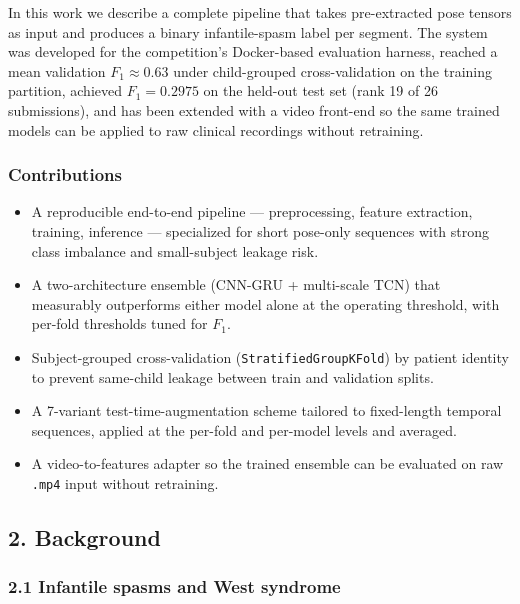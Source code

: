 \documentclass[
  11pt,
]{article}
\providecommand{\tightlist}{%
  \setlength{\itemsep}{0pt}\setlength{\parskip}{0pt}}
\begin{document}
In this work we describe a complete pipeline that takes pre-extracted
pose tensors as input and produces a binary infantile-spasm label per
segment. The system was developed for the competition's Docker-based
evaluation harness, reached a mean validation \(F_1 \approx 0.63\) under
child-grouped cross-validation on the training partition, achieved
\(F_1 = 0.2975\) on the held-out test set (rank 19 of 26 submissions),
and has been extended with a video front-end so the same trained models
can be applied to raw clinical recordings without retraining.

\subsubsection{Contributions}\label{contributions}

\begin{itemize}
\tightlist
\item
  A reproducible end-to-end pipeline --- preprocessing, feature
  extraction, training, inference --- specialized for short pose-only
  sequences with strong class imbalance and small-subject leakage risk.
\item
  A two-architecture ensemble (CNN-GRU + multi-scale TCN) that
  measurably outperforms either model alone at the operating threshold,
  with per-fold thresholds tuned for \(F_1\).
\item
  Subject-grouped cross-validation (\texttt{StratifiedGroupKFold}) by
  patient identity to prevent same-child leakage between train and
  validation splits.
\item
  A 7-variant test-time-augmentation scheme tailored to fixed-length
  temporal sequences, applied at the per-fold and per-model levels and
  averaged.
\item
  A video-to-features adapter so the trained ensemble can be evaluated
  on raw \texttt{.mp4} input without retraining.
\end{itemize}

\subsection{2. Background}\label{background}

\subsubsection{2.1 Infantile spasms and West
syndrome}\label{infantile-spasms-and-west-syndrome}
\end{document}
